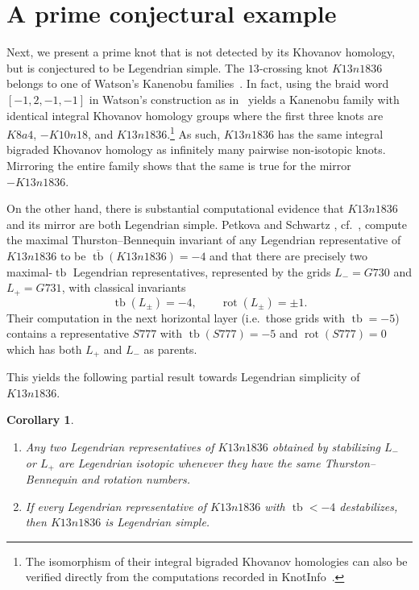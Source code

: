 \documentclass{amsart} %
\DeclareMathOperator{\rot}{rot}
\DeclareMathOperator{\tb}{tb}
\theoremstyle{thm}
\newtheorem{corollary}[Theorem]{Corollary}
\theoremstyle{definition}
\numberwithin{equation}{section}
\begin{document}
\section{A prime conjectural example}

Next, we present a prime knot that is not detected by its Khovanov homology, but is conjectured to be Legendrian simple. The $13$-crossing knot $K13n1836$ belongs to one of Watson's Kanenobu families~\cite{Wat07}. In fact, using the braid word $[-1,2,-1,-1]$ in Watson's construction as in~\cite[Section 7.1]{Wat07} yields a Kanenobu family with identical integral Khovanov homology groups where the first three knots are $K8a4$, $-K10n18$, and $K13n1836$.\footnote{The isomorphism of their integral bigraded Khovanov homologies can also be verified directly from the computations recorded in KnotInfo~\cite{KnotInfo}.}
As such, $K13n1836$ has the same integral bigraded
Khovanov homology as infinitely many pairwise non-isotopic knots. Mirroring the entire family shows that the same is true for the mirror $-K13n1836$.

On the other hand, there is substantial computational evidence that $K13n1836$ and its mirror are both Legendrian simple. Petkova and Schwartz \cite{PetkovaSchwartz}, cf.\ \cite{LSULegendrianAtlas}, compute the maximal Thurston--Bennequin invariant of any Legendrian representative of $K13n1836$ to be $\overline{\tb}(K13n1836)=-4$ and that there are precisely two maximal-$\tb$ Legendrian representatives, represented by the grids \(L_-=G730\) and \(L_+=G731\), with classical invariants
\[
        \tb(L_\pm)=-4,
        \qquad
        \rot(L_\pm)=\pm1.
\]
Their computation in the next horizontal layer (i.e.\ those grids with $\tb=-5$) contains a representative $S777$
with \(\tb(S777)=-5\) and $\rot(S777)=0$ which has both \(L_+\) and \(L_-\) as parents.

This yields the following partial result towards Legendrian simplicity of \(K13n1836\).

\begin{corollary}\hfill
\begin{enumerate}
    \item Any two Legendrian representatives of \(K13n1836\) obtained by stabilizing
\(L_-\) or \(L_+\) are Legendrian isotopic whenever they have the same
Thurston--Bennequin and rotation numbers.
    \item If every Legendrian representative of \(K13n1836\) with
\(\tb<-4\) destabilizes, then \(K13n1836\) is Legendrian simple.
\end{enumerate}
\end{corollary}
\end{document}

